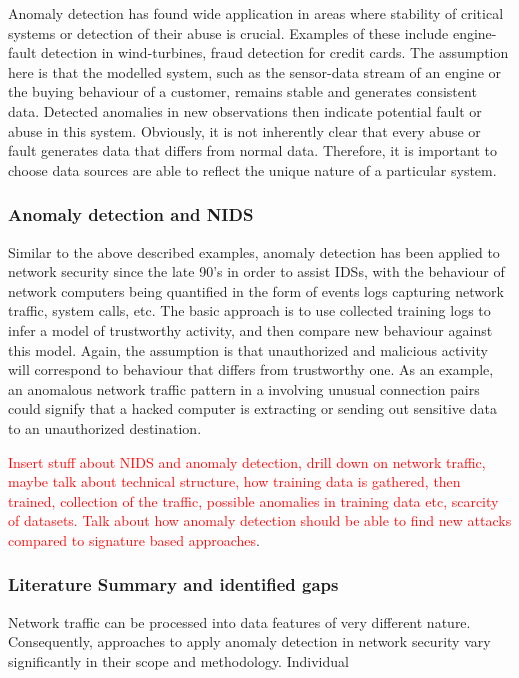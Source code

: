 \documentclass[a4paper,12pt,twoside]{report}
\begin{document}
Anomaly detection has found wide application in areas where stability of  critical systems or detection of their abuse is crucial. Examples of these include engine-fault detection in wind-turbines, fraud detection for credit cards. The assumption here is that the modelled system, such as the sensor-data stream of an engine or the buying behaviour of a customer, remains stable and generates consistent data. Detected anomalies in new observations then indicate potential fault or abuse in this system. Obviously, it is not inherently clear that every abuse or fault generates data that differs from normal data. Therefore, it is important to choose data sources are able to reflect the unique nature of a particular system.

\subsubsection{Anomaly detection and NIDS}

Similar to the above described examples, anomaly detection has been applied to network security since the late 90's in order to assist IDSs, with the behaviour of network computers being quantified in the form of events logs capturing network traffic, system calls, etc. The basic approach is to use collected training logs to infer a model of trustworthy activity, and then compare new behaviour against this model. Again, the assumption is that unauthorized and malicious activity will correspond to behaviour that differs from trustworthy one. As an example, an anomalous network traffic pattern in a involving unusual connection pairs could
signify that a hacked computer is extracting or sending out sensitive data to an unauthorized destination.

\textcolor{red}{Insert stuff about NIDS and anomaly detection, drill down on network traffic, maybe talk about technical structure, how training data is gathered, then trained, collection of the traffic, possible anomalies in training data etc, scarcity of datasets. Talk about how anomaly detection should be able to find new attacks compared to signature based approaches}.

\subsubsection{Literature Summary and identified gaps}


Network traffic can be processed into data features of very different nature. Consequently, approaches to apply anomaly detection in network security vary significantly in their scope and methodology. Individual 
\end{document}
